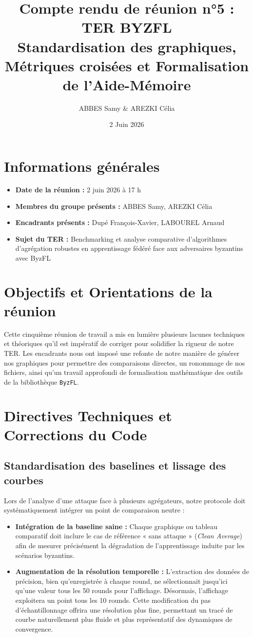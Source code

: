 \documentclass[11pt, a4paper]{article}
\title{\textbf{Compte rendu de réunion n°5 : TER BYZFL} \\ \large Standardisation des graphiques, Métriques croisées et Formalisation de l'Aide-Mémoire}
\author{ABBES Samy \& AREZKI Célia}
\date{2 Juin 2026}
\begin{document}
\maketitle

\section*{Informations générales}
\begin{itemize}
    \item \textbf{Date de la réunion :} 2 juin 2026 à 17 h
    \item \textbf{Membres du groupe présents :} ABBES Samy, AREZKI Célia
    \item \textbf{Encadrants présents :} Dupé François-Xavier, LABOUREL Arnaud
    \item \textbf{Sujet du TER :} Benchmarking et analyse comparative d'algorithmes d'agrégation robustes en apprentissage fédéré face aux adversaires byzantins avec ByzFL
\end{itemize}

\section{Objectifs et Orientations de la réunion}
Cette cinquième réunion de travail a mis en lumière plusieurs lacunes techniques et théoriques qu'il est impératif de corriger pour solidifier la rigueur de notre TER. Les encadrants nous ont imposé une refonte de notre manière de générer nos graphiques pour permettre des comparaisons directes, un ronommage de nos fichiers, ainsi qu'un travail approfondi de formalisation mathématique des outils de la bibliothèque \texttt{ByzFL}.

\section{Directives Techniques et Corrections du Code}

\subsection{Standardisation des baselines et lissage des courbes}
Lors de l'analyse d'une attaque face à plusieurs agrégateurs, notre protocole doit systématiquement intégrer un point de comparaison neutre :
\begin{itemize}
    \item \textbf{Intégration de la baseline saine :} Chaque graphique ou tableau comparatif doit inclure le cas de référence « sans attaque » (\textit{Clean Average}) afin de mesurer précisément la dégradation de l'apprentissage induite par les scénarios byzantins.
    \item \textbf{Augmentation de la résolution temporelle :} L'extraction des données de précision, bien qu'enregistrée à chaque round, ne sélectionnait jusqu'ici qu'une valeur tous les 50 rounds pour l'affichage. Désormais, l'affichage exploitera un point tous les 10 rounds. Cette modification du pas d'échantillonnage offrira une résolution plus fine, permettant un tracé de courbe naturellement plus fluide et plus représentatif des dynamiques de convergence.
\end{itemize}
\end{document}

